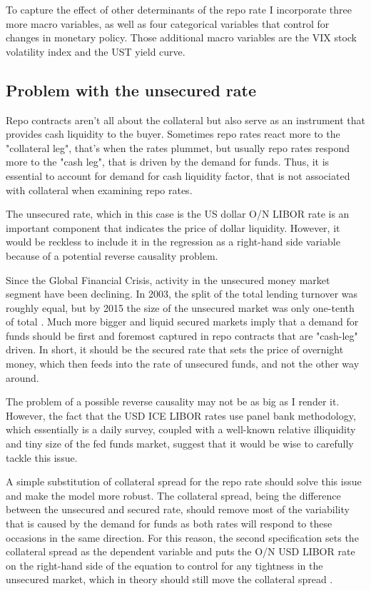 \documentclass[11pt,a4paper,english,oneside]{article}
\begin{document}

To capture the effect of other determinants of the repo rate I incorporate three more macro variables, as well as four categorical variables that control for changes in monetary policy. Those additional macro variables are the VIX stock volatility index and the UST yield curve.

\subsection{Problem with the unsecured rate}

Repo contracts aren't all about the collateral but also serve as an instrument that provides cash liquidity to the buyer. Sometimes repo rates react more to the "collateral leg", that's when the rates plummet, but usually repo rates respond more to the "cash leg", that is driven by the demand for funds. Thus, it is essential to account for demand for cash liquidity factor, that is not associated with collateral when examining repo rates.

The unsecured rate, which in this case is the US dollar O/N LIBOR rate is an important component that indicates the price of dollar liquidity. However, it would be reckless to include it in the regression as a right-hand side variable because of a potential reverse causality problem.

Since the Global Financial Crisis, activity in the unsecured money market segment have been declining. In 2003, the split of the total lending turnover was roughly equal, but by 2015 the size of the unsecured market was only one-tenth of total \citet{fiore2018}. Much more bigger and liquid secured markets imply that a demand for funds should be first and foremost captured in repo contracts that are "cash-leg" driven. In short, it should be the secured rate that sets the price of overnight money, which then feeds into the rate of unsecured funds, and not the other way around.

The problem of a possible reverse causality may not be as big as I render it. However, the fact that the USD ICE LIBOR rates use panel bank methodology, which essentially is a daily survey, coupled with a well-known relative illiquidity and tiny size of the fed funds market, suggest that it would be wise to carefully tackle this issue.

A simple substitution of collateral spread for the repo rate should solve this issue and make the model more robust. The collateral spread, being the difference between the unsecured and secured rate, should remove most of the variability that is caused by the demand for funds as both rates will respond to these occasions in the same direction. For this reason, the second specification sets the collateral spread as the dependent variable and puts the O/N USD LIBOR rate on the right-hand side of the equation to control for any tightness in the unsecured market, which in theory should still move the collateral spread \citet{nyborg2019a}. 
\end{document}
